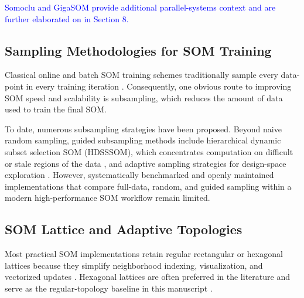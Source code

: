 \documentclass[10pt]{article} %
\newcommand{\TrackedChange}[1]{\textcolor{blue}{#1}}
\begin{document}
\TrackedChange{Somoclu and GigaSOM provide additional parallel-systems context \citep{wittekSomocluEfficientParallel2017,kratochvilGigaSOMjlHighperformanceClustering2020} and are further elaborated on in Section 8.}

\subsection{Sampling Methodologies for SOM Training}

Classical online and batch SOM training schemes traditionally sample every data-point in every training iteration \citep{kohonenSelfOrganizingMaps2001,liuRobustPhenotypingHighly2023}. Consequently, one obvious route to improving SOM speed and scalability is subsampling, which reduces the amount of data used to train the final SOM.

To date, numerous subsampling strategies have been proposed. Beyond naive random sampling, guided subsampling methods include hierarchical dynamic subset selection SOM (HDSSSOM), which concentrates computation on difficult or stale regions of the data \citep{wetmoreSpeedingSelfOrganizingFeature2005}, and adaptive sampling strategies for design-space exploration \citep{itoDesignSpaceExploration2016}. However, systematically benchmarked and openly maintained implementations that compare full-data, random, and guided sampling within a modern high-performance SOM workflow remain limited.

\subsection{SOM Lattice and Adaptive Topologies}

Most practical SOM implementations retain regular rectangular or hexagonal lattices because they simplify neighborhood indexing, visualization, and vectorized updates \citep{kohonenSelforganizingMap1990,kohonenEssentialsSelforganizingMap2013}. Hexagonal lattices are often preferred in the literature and serve as the regular-topology baseline in this manuscript \citep{whiteTopologyMattersNetwork2008,kohonenEssentialsSelforganizingMap2013,forestSurveyImplementationPerformance2020}.
\end{document}
